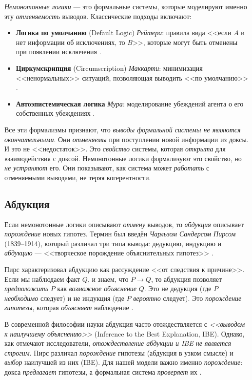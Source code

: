 \documentclass[12pt,a4paper]{article}
\begin{document}
\emph{Немонотонные логики} --- это формальные системы, которые моделируют именно
эту \emph{отменяемость} выводов. Классические подходы включают:

\begin{itemize}
	\item \textbf{Логика по умолчанию} (Default Logic) \emph{Рейтера}: правила вида <<если $A$ и нет информации об исключениях, то $B$>>, которые могут быть отменены при появлении исключения \cite{reiter}.
	\item \textbf{Циркумскрипция} (Circumscription) \emph{Маккарти}: минимизация <<ненормальных>> ситуаций, позволяющая выводить <<по умолчанию>> \cite{mccarthy}.
	\item \textbf{Автоэпистемическая логика} \emph{Мура}: моделирование убеждений агента о его собственных убеждениях \cite{moore}.
\end{itemize}

Все эти формализмы признают, что \emph{выводы формальной системы не являются окончательными}.
Они \emph{отменяемы} при поступлении новой информации из доксы. И это не <<недостаток>>.
Это \emph{свойство} системы, которая \emph{открыта} для взаимодействия с доксой. Немонотонные
логики формализуют это свойство, но \emph{не устраняют} его. Они показывают, как система может
\emph{работать} с отменяемыми выводами, не теряя когерентности.

\subsection{Абдукция}
\label{sec:abduction}

Если немонотонные логики описывают \emph{отмену} выводов, то \emph{абдукция} описывает
\emph{порождение} новых гипотез. Термин был введён \emph{Чарльзом Сандерсом Пирсом} (1839--1914),
который различал три типа вывода: дедукцию, индукцию и \emph{абдукцию} --- <<творческое порождение
объяснительных гипотез>> \cite{peirce_ru}.

Пирс характеризовал абдукцию как рассуждение <<от следствия к причине>>. Если мы наблюдаем факт
$Q$, и знаем, что $P \to Q$, то абдукция позволяет \emph{предположить} $P$ как
\emph{возможное объяснение} $Q$. Это не дедукция (где $P$ \emph{необходимо} следует) и не индукция
(где $P$ \emph{вероятно} следует). Это \emph{порождение гипотезы}, которая \emph{объясняет}
наблюдение \cite{peirce_cp}.

В современной философии науки абдукция часто отождествляется с \emph{<<выводом к наилучшему
объяснению>>} (Inference to the Best Explanation, IBE). Однако, как отмечают исследователи,
\emph{отождествление абдукции и IBE не является строгим}. Пирс различал \emph{порождение} гипотезы
(абдукция в узком смысле) и \emph{выбор} наилучшей из них (IBE). Для нашей модели важно именно
\emph{порождение}: докса \emph{предлагает} гипотезы, а формальная система \emph{проверяет} их \cite{niiniluoto}.
\end{document}
